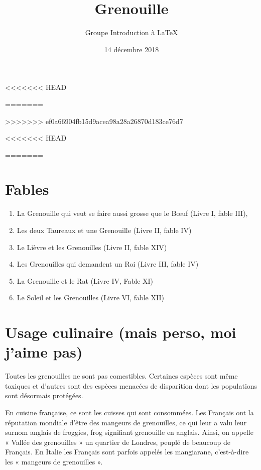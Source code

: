 \documentclass[10pt,a4paper]{article}
\title{Grenouille}
\date {14 décembre 2018}
\author{Groupe Introduction à \LaTeX}
\begin{document}


	\maketitle
<<<<<<< HEAD
	
	
	
	
=======
	





>>>>>>> ef0a66904fb15d9acea98a28a26870d183ce76d7
	
	
<<<<<<< HEAD
	
	
	
=======
	\section*{Fables}
		\begin{enumerate}
			\item La Grenouille qui veut se faire aussi grosse que le Bœuf (Livre I, fable III),
			\item Les deux Taureaux et une Grenouille (Livre II, fable IV)
			\item Le Lièvre et les Grenouilles (Livre II, fable XIV)
			\item Les Grenouilles qui demandent un Roi (Livre III, fable IV)
			\item La Grenouille et le Rat (Livre IV, Fable XI)
			\item Le Soleil et les Grenouilles (Livre VI, fable XII)
		\end{enumerate}
		\section{Usage culinaire (mais perso, moi j'aime pas)}

Toutes les grenouilles ne sont pas comestibles. Certaines espèces sont même toxiques et d'autres sont des espèces menacées de disparition dont les populations sont désormais protégées.

En cuisine française, ce sont les cuisses qui sont consommées. Les Français ont la réputation mondiale d'être des mangeurs de grenouilles, ce qui leur a valu leur surnom anglais de froggies, frog signifiant grenouille en anglais. Ainsi, on appelle « Vallée des grenouilles » un quartier de Londres, peuplé de beaucoup de Français.
En Italie les Français sont parfois appelés les mangiarane, c'est-à-dire les « mangeurs de grenouilles ».
\end{document}

